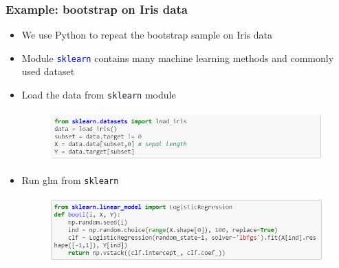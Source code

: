 \documentclass[red]{beamer}
\begin{document}
\begin{frame}
\frametitle{Example: bootstrap on Iris data}
\begin{itemize}
	\item We use Python to repeat the bootstrap sample on Iris data
	\item Module \textcolor{blue}{\texttt{sklearn}} contains many machine learning methods and commonly used dataset
	\item Load the data from \texttt{sklearn} module
	\begin{figure}
		\centering
		\includegraphics[width=1\linewidth]{figure/screenshot026}
	\end{figure}
	\item Run glm from \texttt{sklearn}
	\begin{figure}
		\centering
		\includegraphics[width=1\linewidth]{figure/screenshot027}
	\end{figure}
\end{itemize}
\end{frame}
\end{document}
